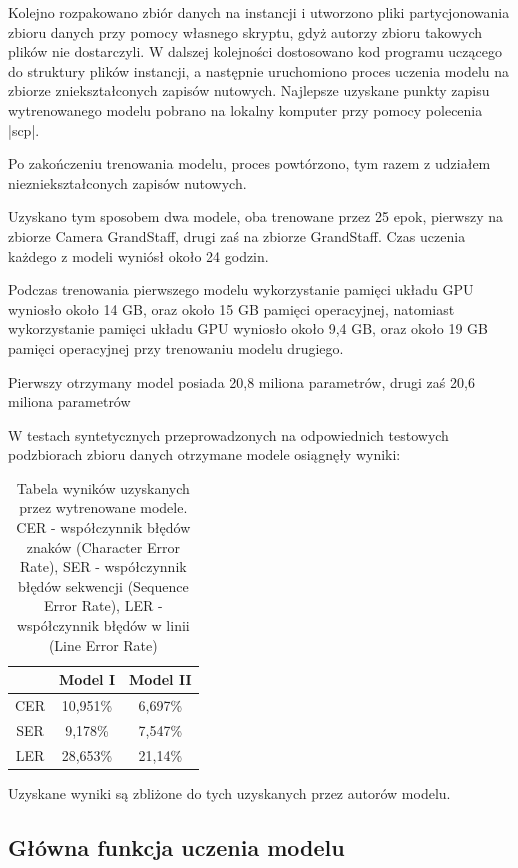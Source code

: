 Kolejno rozpakowano zbiór danych na instancji i utworzono pliki partycjonowania zbioru danych przy pomocy własnego skryptu, gdyż autorzy zbioru takowych plików nie dostarczyli. W dalszej kolejności dostosowano kod programu uczącego do struktury plików instancji, a następnie uruchomiono proces uczenia modelu na zbiorze zniekształconych zapisów nutowych. Najlepsze uzyskane punkty zapisu wytrenowanego modelu pobrano na lokalny komputer przy pomocy polecenia \pyth|scp|. 

Po zakończeniu trenowania modelu, proces powtórzono, tym razem z udziałem niezniekształconych zapisów nutowych.

Uzyskano tym sposobem dwa modele, oba trenowane przez 25 epok, pierwszy na zbiorze Camera GrandStaff, drugi zaś na zbiorze GrandStaff. Czas uczenia każdego z modeli wyniósł około 24 godzin.

Podczas trenowania pierwszego modelu wykorzystanie pamięci układu GPU wyniosło około 14 GB, oraz około 15 GB pamięci operacyjnej, natomiast wykorzystanie pamięci układu GPU wyniosło około 9,4  GB, oraz około 19 GB pamięci operacyjnej przy trenowaniu modelu drugiego.

Pierwszy otrzymany model posiada 20,8 miliona parametrów, drugi zaś 20,6 miliona parametrów

W testach syntetycznych przeprowadzonych na odpowiednich testowych podzbiorach zbioru danych otrzymane modele osiągnęły wyniki:

\begin{table}[htb]
	\centering
	\begin{tabular}{|c|c|c|}
		\hline
		\ & Model I & Model II \\
		\hline
		CER & 10,951\% & 6,697\% \\
		SER &  9,178\% & 7,547\% \\
		LER & 28,653\% & 21,14\% \\
		\hline
	\end{tabular}
	\caption{Tabela wyników uzyskanych przez wytrenowane modele. CER - współczynnik błędów znaków (Character Error Rate), SER - współczynnik błędów sekwencji (Sequence Error Rate), LER - współczynnik błędów w linii (Line Error Rate)}
	\label{models-scores}
\end{table}

Uzyskane wyniki są zbliżone do tych uzyskanych przez autorów modelu\cite{Rios-Vila2023}.

\subsection{Główna funkcja uczenia modelu}

